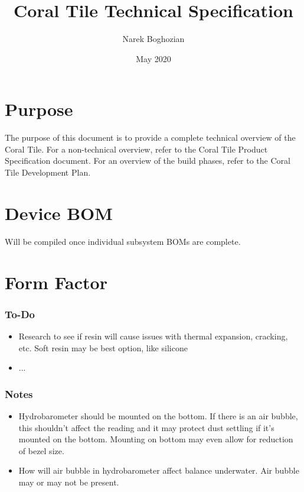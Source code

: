 \documentclass{article}
\title{Coral Tile Technical Specification}
\author{Narek Boghozian}
\date{May 2020}
\begin{document}
\maketitle
\tableofcontents
\pagebreak
\section{Purpose}
The purpose of this document is to provide a complete technical overview of the Coral Tile. For a non-technical overview, refer to the Coral Tile Product Specification document. For an overview of the build phases, refer to the Coral Tile Development Plan.




\section{Device BOM}

Will be compiled once individual subsystem BOMs are complete.

\pagebreak

\section{Form Factor}

\subsubsection{To-Do}
\begin{itemize}
    \item Research to see if resin will cause issues with thermal expansion, cracking, etc. Soft resin may be best option, like silicone
    \item ...
\end{itemize}

\subsubsection{Notes}
\begin{itemize}
    \item Hydrobarometer should be mounted on the bottom. If there is an air bubble, this shouldn't affect the reading and it may protect dust settling if it's mounted on the bottom. Mounting on bottom may even allow for reduction of bezel size.
    \item How will air bubble in hydrobarometer affect balance underwater. Air bubble may or may not be present.
\end{itemize}
\end{document}
